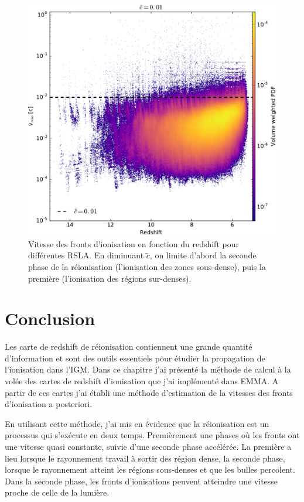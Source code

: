 \begin{figure}
        \includegraphics[height=0.3\textheight]{img/04_mapreio/speedreio_z_c001.pdf} 
        \caption[Évolution de la vitesse des fronts - histogrammes]{Vitesse des fronts d'ionisation en fonction du redshift pour différentes \ac{RSLA}.
        En diminuant $\tilde{c}$, on limite d'abord la seconde phase de la réionisation (l'ionisation des zones sous-dense), puis la première (l'ionisation des régions sur-denses).
 		\label{fig:vreioz} }
\end{figure}




\clearpage
\section{Conclusion}

Les carte de redshift de réionisation contiennent une grande quantité d'information et sont des outils essentiels pour étudier la propagation de l'ionisation dans l'\ac{IGM}.
Dans ce chapitre j'ai présenté la méthode de calcul à la volée des cartes de redshift d'ionisation que j'ai implémenté dans EMMA.
A partir de ces cartes j'ai établi une méthode d’estimation de la vitesses des fronts d'ionisation a posteriori.

En utilisant cette méthode, j'ai mis en évidence que la réionisation est un processus qui s’exécute en deux temps.
Premièrement une phases où les fronts ont une vitesse quasi constante, suivie d'une seconde phase accélérée.
La première a lieu lorsque le rayonnement travail à sortir des région dense, la seconde phase, lorsque le rayonnement atteint les régions sous-denses et que les bulles percolent.
Dans la seconde phase, les fronts d'ionisations peuvent atteindre une vitesse proche de celle de la lumière.

